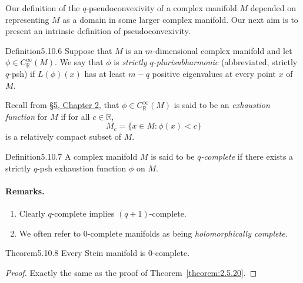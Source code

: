 Our definition of the $q$-pseudoconvexivity of a complex manifold $M$ depended on representing $M$ as a domain in some larger complex manifold. Our next aim is to present an intrinsic definition of pseudoconvexivity.
\begin{originaltheorem}{Definition}{5.10.6}
Suppose that $M$ is an $m$-dimensional complex manifold and let $\phi\in C_{\mathbb R}^\infty(M)$. We say that $\phi$ is \emph{strictly $q$-plurisubharmonic} (abbreviated, strictly $q$-psh) if $L(\phi)(x)$ has at least $m-q$ positive eigenvalues at every point $x$ of $M$.
\end{originaltheorem}
Recall from \hyperref[sec:2:5]{\S5, Chapter 2}, that $\phi\in C_{\mathbb R}^\infty(M)$ is said to be an \emph{exhaustion function} for $M$ if for all $c\in\mathbb R$,
\[M_c=\{x\in M:\phi(x)<c\}\]
is a relatively compact subset of $M$.
\begin{originaltheorem}{Definition}{5.10.7}
A complex manifold $M$ is said to be \emph{$q$-complete} if there exists a strictly $q$-psh exhaustion function $\phi$ on $M$.
\end{originaltheorem}
\paragraph{Remarks.}
\begin{enumerate}
\item Clearly $q$-complete implies $(q+1)$-complete.
\item We often refer to 0-complete manifolds as being \emph{holomorphically complete}.
\end{enumerate}
\begin{originaltheorem}{Theorem}{5.10.8}
Every Stein manifold is 0-complete.
\end{originaltheorem}
\begin{proof} Exactly the same as the proof of Theorem~\ref{theorem:2.5.20}. \end{proof}
